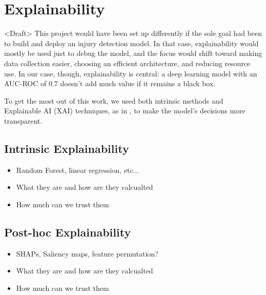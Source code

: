\section{Explainability}\label{sec:method-explainability}
<Draft> This project would have been set up differently if the sole goal had been to build and deploy an injury detection model. In that case, explainability would mostly be used just to debug the model, and the focus would shift toward making data collection easier, choosing an efficient architecture, and reducing resource use. In our case, though, explainability is central: a deep learning model with an AUC-ROC of 0.7 doesn't add much value if it remains a black box.

To get the most out of this work, we used both intrinsic methods and Explainable AI (XAI) techniques, as in \cite{FuentesJimnez2025}, to make the model's decisions more transparent.

\subsection{Intrinsic Explainability}\label{subsec:method-intrinsic-explainability}
\begin{itemize}
    \item Random Forest, linear regression, etc...
    \item What they are and how are they calcualted
    \item How much can we trust them
\end{itemize}

\subsection{Post-hoc Explainability}\label{subsec:method-posthoc-explainability}
\begin{itemize}
    \item SHAPs, Saliency maps, feature permutation?
    \item What they are and how are they calcualted
    \item How much can we trust them
\end{itemize}

